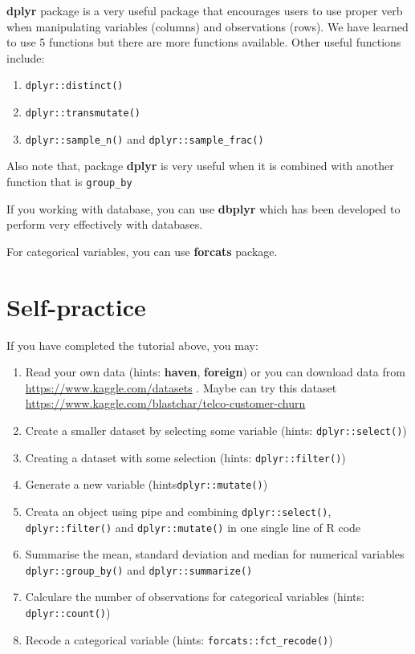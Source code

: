 \documentclass[
  10pt,
]{krantz}
\providecommand{\tightlist}{%
  \setlength{\itemsep}{0pt}\setlength{\parskip}{0pt}}
\begin{document}
\textbf{dplyr} package is a very useful package that encourages users to use proper verb when manipulating variables (columns) and observations (rows). We have learned to use 5 functions but there are more functions available. Other useful functions include:

\begin{enumerate}
\def\labelenumi{\arabic{enumi}.}
\tightlist
\item
  \texttt{dplyr::distinct()}
\item
  \texttt{dplyr::transmutate()}
\item
  \texttt{dplyr::sample\_n()} and \texttt{dplyr::sample\_frac()}
\end{enumerate}

Also note that, package \textbf{dplyr} is very useful when it is combined with another function that is \texttt{group\_by}

If you working with database, you can use \textbf{dbplyr} which has been developed to perform very effectively with databases.

For categorical variables, you can use \textbf{forcats} package.

\hypertarget{self-practice}{%
\section{Self-practice}\label{self-practice}}

If you have completed the tutorial above, you may:

\begin{enumerate}
\def\labelenumi{\arabic{enumi}.}
\tightlist
\item
  Read your own data (hints: \textbf{haven}, \textbf{foreign}) or you can download data from \url{https://www.kaggle.com/datasets} . Maybe can try this dataset \url{https://www.kaggle.com/blastchar/telco-customer-churn}
\item
  Create a smaller dataset by selecting some variable (hints: \texttt{dplyr::select()})
\item
  Creating a dataset with some selection (hints: \texttt{dplyr::filter()})
\item
  Generate a new variable (hints\texttt{dplyr::mutate()})
\item
  Creata an object using pipe and combining \texttt{dplyr::select()}, \texttt{dplyr::filter()} and \texttt{dplyr::mutate()} in one single line of R code
\item
  Summarise the mean, standard deviation and median for numerical variables \texttt{dplyr::group\_by()} and \texttt{dplyr::summarize()}
\item
  Calculare the number of observations for categorical variables (hints: \texttt{dplyr::count()})
\item
  Recode a categorical variable (hints: \texttt{forcats::fct\_recode()})
\end{enumerate}
\end{document}
